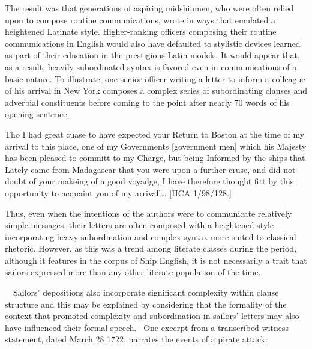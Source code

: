 \begin{styleStandard}
The result was that generations of aspiring midshipmen, who were often relied upon to compose routine communications, wrote in ways that emulated a heightened Latinate style. Higher-ranking officers composing their routine communications in English would also have defaulted to stylistic devices learned as part of their education in the prestigious Latin models. It would appear that, as a result, heavily subordinated syntax is favored even in communications of a basic nature. To illustrate, one senior officer writing a letter to inform a colleague of his arrival in New York composes a complex series of subordinating clauses and adverbial constituents before coming to the point after nearly 70 words of his opening sentence.
\end{styleStandard}

\begin{styleStandard}
Tho I had great cuase to have expected your Return to Boston at the time of my arrival to this place, one of my Governments [government men] which his Majesty has been pleased to committ to my Charge, but being Informed by the ships that Lately came from Madagascar that you were upon a further cruse, and did not doubt of your makeing of a good voyadge, I have therefore thought fitt by this opportunity to acquaint you of my arrivall… [HCA 1/98/128.]
\end{styleStandard}

\begin{styleStandard}
Thus, even when the intentions of the authors were to communicate relatively simple messages, their letters are often composed with a heightened style incorporating heavy subordination and complex syntax more suited to classical rhetoric. However, as this was a trend among literate classes during the period, although it features in the corpus of Ship English, it is not necessarily a trait that sailors expressed more than any other literate population of the time. 
\end{styleStandard}

\begin{styleStandard}
\ \ Sailors’ depositions also incorporate significant complexity within clause structure and this may be explained by considering that the formality of the context that promoted complexity and subordination in sailors’ letters may also have influenced their formal speech. \ One excerpt from a transcribed witness statement, dated March 28 1722, narrates the events of a pirate attack:
\end{styleStandard}

